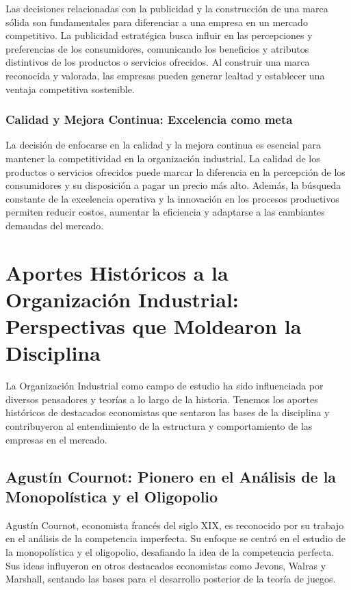 \documentclass[
  doc,
  floatsintext,
  longtable,
  a4paper,
  nolmodern,
  notxfonts,
  notimes,
  colorlinks=true,linkcolor=blue,citecolor=blue,urlcolor=blue]{apa7}
\begin{document}
Las decisiones relacionadas con la publicidad y la construcción de una
marca sólida son fundamentales para diferenciar a una empresa en un
mercado competitivo. La publicidad estratégica busca influir en las
percepciones y preferencias de los consumidores, comunicando los
beneficios y atributos distintivos de los productos o servicios
ofrecidos. Al construir una marca reconocida y valorada, las empresas
pueden generar lealtad y establecer una ventaja competitiva sostenible.

\subsubsection{Calidad y Mejora Continua: Excelencia como
meta}\label{calidad-y-mejora-continua-excelencia-como-meta}

La decisión de enfocarse en la calidad y la mejora continua es esencial
para mantener la competitividad en la organización industrial. La
calidad de los productos o servicios ofrecidos puede marcar la
diferencia en la percepción de los consumidores y su disposición a pagar
un precio más alto. Además, la búsqueda constante de la excelencia
operativa y la innovación en los procesos productivos permiten reducir
costos, aumentar la eficiencia y adaptarse a las cambiantes demandas del
mercado.

\section{Aportes Históricos a la Organización Industrial: Perspectivas
que Moldearon la
Disciplina}\label{aportes-histuxf3ricos-a-la-organizaciuxf3n-industrial-perspectivas-que-moldearon-la-disciplina}

La Organización Industrial como campo de estudio ha sido influenciada
por diversos pensadores y teorías a lo largo de la historia. Tenemos los
aportes históricos de destacados economistas que sentaron las bases de
la disciplina y contribuyeron al entendimiento de la estructura y
comportamiento de las empresas en el mercado.

\subsection{Agustín Cournot: Pionero en el Análisis de la Monopolística
y el
Oligopolio}\label{agustuxedn-cournot-pionero-en-el-anuxe1lisis-de-la-monopoluxedstica-y-el-oligopolio}

Agustín Cournot, economista francés del siglo XIX, es reconocido por su
trabajo en el análisis de la competencia imperfecta. Su enfoque se
centró en el estudio de la monopolística y el oligopolio, desafiando la
idea de la competencia perfecta. Sus ideas influyeron en otros
destacados economistas como Jevons, Walras y Marshall, sentando las
bases para el desarrollo posterior de la teoría de juegos.
\end{document}
